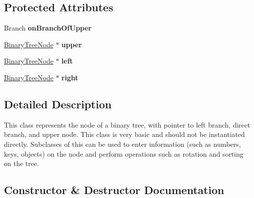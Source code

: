 \subsection*{Protected Attributes}
\begin{DoxyCompactItemize}
\item 
\mbox{\label{classDataJuggler_1_1BinaryTreeNode_ac4fc27cfb417375f9b9867f52ec03019}} 
Branch {\bfseries on\+Branch\+Of\+Upper}
\item 
\mbox{\label{classDataJuggler_1_1BinaryTreeNode_a731d7b7e81097ea2d3173717ad272c5f}} 
\hyperlink{classDataJuggler_1_1BinaryTreeNode}{Binary\+Tree\+Node} $\ast$ {\bfseries upper}
\item 
\mbox{\label{classDataJuggler_1_1BinaryTreeNode_a1ea539098abf8cbcb5afdffa9061f2df}} 
\hyperlink{classDataJuggler_1_1BinaryTreeNode}{Binary\+Tree\+Node} $\ast$ {\bfseries left}
\item 
\mbox{\label{classDataJuggler_1_1BinaryTreeNode_a874efcd449929ca1ac8c881c93621a7f}} 
\hyperlink{classDataJuggler_1_1BinaryTreeNode}{Binary\+Tree\+Node} $\ast$ {\bfseries right}
\end{DoxyCompactItemize}


\subsection{Detailed Description}
This class represents the node of a binary tree, with pointer to left branch, direct branch, and upper node. This class is very basic and should not be instantiated directly. Subclasses of this can be used to enter information (such as numbers, keys, objects) on the node and perform operations such as rotation and sorting on the tree. 

\subsection{Constructor \& Destructor Documentation}
\mbox{\label{classDataJuggler_1_1BinaryTreeNode_af2995ef47057ef14f617af026998afc1}} 
